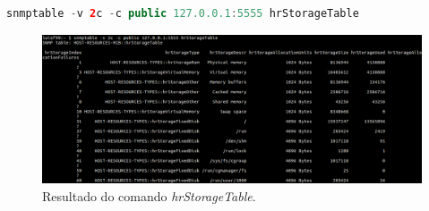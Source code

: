 \documentclass[../momento_1.tex]{subfiles}
\begin{document}
{
\begin{lstlisting}[caption={Comando \textit{hrStorageTable} usado},label={lst:comand},language=JAVA]
	snmptable -v 2c -c public 127.0.0.1:5555 hrStorageTable
\end{lstlisting}}

\begin{figure}[H]
\centering
\captionsetup{justification=centering,margin=2cm}
\centerline{\includegraphics[scale=0.4]{../imagens/storageTable.png}}
\caption{Resultado do comando \textit{hrStorageTable}.}
\label{fig:part}
\end{figure}
\end{document}
